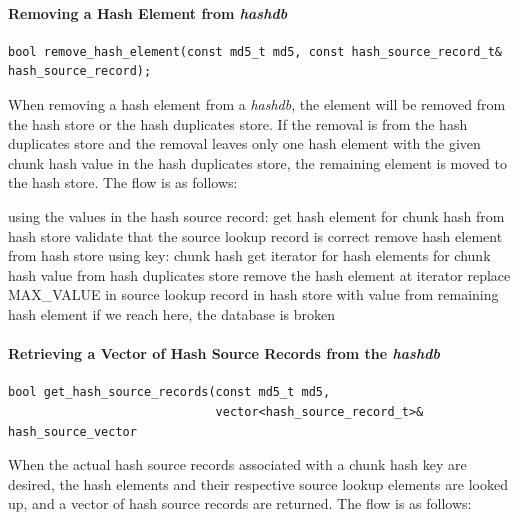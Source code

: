 \documentclass[12pt,twoside]{article}
\newcommand{\hdb}{\emph{hashdb}\xspace}
\begin{document}
\paragraph{Removing a Hash Element from \hdb}
\begin{small}
\begin{verbatim}
bool remove_hash_element(const md5_t md5, const hash_source_record_t& hash_source_record);
\end{verbatim}
\end{small}
When removing a hash element from a \hdb,
the element will be removed from the hash store or the hash duplicates store.
If the removal is from the hash duplicates store
and the removal leaves only one hash element with the given chunk hash value
in the hash duplicates store,
the remaining element is moved to the hash store.
The flow is as follows:

\begin{algorithmic}
\STATE using the values in the hash source record:
  \RETURN \FALSE
\ENDIF
\STATE get hash element for chunk hash from hash store
  \STATE validate that the source lookup record is correct
  \STATE remove hash element from hash store using key: chunk hash
  \RETURN \TRUE
\ELSE
  \STATE get iterator for hash elements for chunk hash value from hash duplicates store
      \STATE remove the hash element at iterator
        \STATE replace MAX\_VALUE in source lookup record in hash store with value from remaining hash element
      \ENDIF
      \RETURN \TRUE
    \ENDIF
  \ENDFOR
  \STATE if we reach here, the database is broken
  \RETURN \FALSE
\ENDIF
\end{algorithmic}

\paragraph{Retrieving a Vector of Hash Source Records from the \hdb}
\begin{small}
\begin{verbatim}
bool get_hash_source_records(const md5_t md5,
                             vector<hash_source_record_t>& hash_source_vector
\end{verbatim}
\end{small}
When the actual hash source records associated with a chunk hash key are desired,
the hash elements and their respective source lookup elements are looked up,
and a vector of hash source records are returned.
The flow is as follows:
\end{document}
